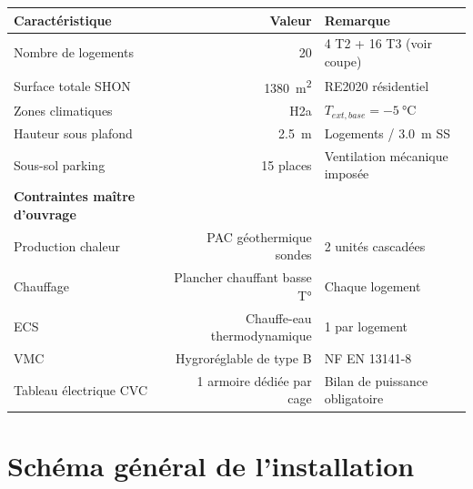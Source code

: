 \begin{center}
\begin{tabular}{lrl}
  \toprule
  \textbf{Caractéristique} & \textbf{Valeur} & \textbf{Remarque} \\
  \midrule
  Nombre de logements & 20 & 4 T2 + 16 T3 (voir coupe) \\
  Surface totale SHON & \SI{1380}{\metre\squared} & RE2020 résidentiel \\
  Zones climatiques & H2a & $T_{ext,base} = \SI{-5}{\celsius}$ \\
  Hauteur sous plafond & \SI{2.5}{\metre} & Logements / \SI{3.0}{\metre} SS \\
  Sous-sol parking & 15 places & Ventilation mécanique imposée \\
  \midrule
  \textbf{Contraintes maître d'ouvrage} & & \\
  \midrule
  Production chaleur & PAC géothermique sondes & 2 unités cascadées \\
  Chauffage & Plancher chauffant basse T° & Chaque logement \\
  ECS & Chauffe-eau thermodynamique & 1 par logement \\
  VMC & Hygroréglable de type B & NF EN 13141-8 \\
  Tableau électrique CVC & 1 armoire dédiée par cage & Bilan de puissance obligatoire \\
  \bottomrule
\end{tabular}
\end{center}

\section{Schéma général de l'installation}

